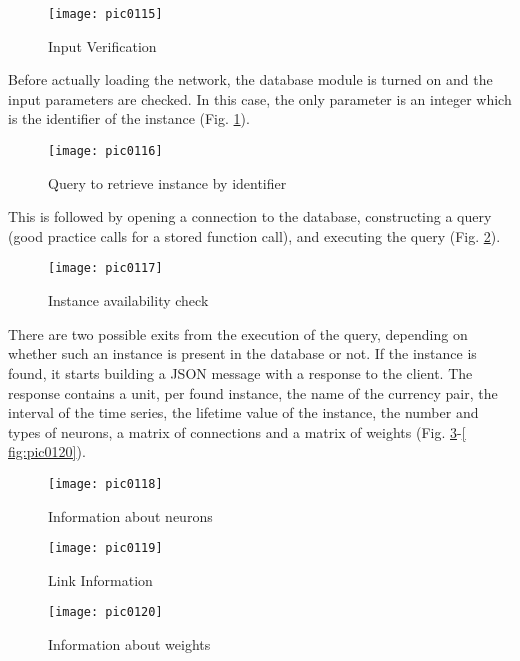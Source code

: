 \begin{figure}[h]
\centering
\texttt{[image: pic0115]}
\caption{Input Verification}
\label{fig:pic0115}
\end{figure}
\FloatBarrier

Before actually loading the network, the database module is turned on and the input parameters are checked. In this case, the only parameter is an integer which is the identifier of the instance (Fig. \ref{fig:pic0115}).

\begin{figure}[h]
\centering
\texttt{[image: pic0116]}
\caption{Query to retrieve instance by identifier}
\label{fig:pic0116}
\end{figure}
\FloatBarrier

This is followed by opening a connection to the database, constructing a query (good practice calls for a stored function call), and executing the query (Fig. \ref{fig:pic0116}).

\begin{figure}[h]
\centering
\texttt{[image: pic0117]}
\caption{Instance availability check}
\label{fig:pic0117}
\end{figure}
\FloatBarrier

There are two possible exits from the execution of the query, depending on whether such an instance is present in the database or not. If the instance is found, it starts building a JSON message with a response to the client. The response contains a unit, per found instance, the name of the currency pair, the interval of the time series, the lifetime value of the instance, the number and types of neurons, a matrix of connections and a matrix of weights (Fig. \ref{fig:pic0117}-\ref{ fig:pic0120}).

\begin{figure}[h]
\centering
\texttt{[image: pic0118]}
\caption{Information about neurons}
\label{fig:pic0118}
\end{figure}
\FloatBarrier

\begin{figure}[h]
\centering
\texttt{[image: pic0119]}
\caption{Link Information}
\label{fig:pic0119}
\end{figure}
\FloatBarrier

\begin{figure}[h]
\centering
\texttt{[image: pic0120]}
\caption{Information about weights}
\label{fig:pic0120}
\end{figure}
\FloatBarrier


